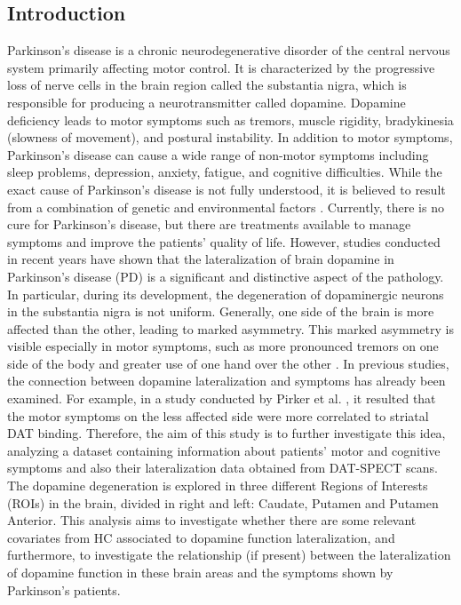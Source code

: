 \documentclass[]{article}
\begin{document}
\begin{multicols}{2}
\section{Introduction}
Parkinson's disease is a chronic neurodegenerative disorder of the central nervous system primarily affecting motor control. It is characterized by the progressive loss of nerve cells in the brain region called the substantia nigra, which is responsible for producing a neurotransmitter called dopamine. Dopamine deficiency leads to motor symptoms such as tremors, muscle rigidity, bradykinesia (slowness of movement), and postural instability. In addition to motor symptoms, Parkinson's disease can cause a wide range of non-motor symptoms including sleep problems, depression, anxiety, fatigue, and cognitive difficulties. While the exact cause of Parkinson's disease is not fully understood, it is believed to result from a combination of genetic and environmental factors \cite{beitz_parkinsons_2014}. Currently, there is no cure for Parkinson's disease, but there are treatments available to manage symptoms and improve the patients’ quality of life.  However, studies conducted in recent years \cite{shigekiyo_laterality_2020} have shown that the lateralization of brain dopamine in Parkinson's disease (PD) is a significant and distinctive aspect of the pathology. In particular, during its development, the degeneration of dopaminergic neurons in the substantia nigra is not uniform. Generally, one side of the brain is more affected than the other, leading to marked asymmetry. This marked asymmetry is visible especially in motor symptoms, such as more pronounced tremors on one side of the body and greater use of one hand over the other \cite{riederer_lateralisation_2018}. 
\newline
In previous studies, the connection between dopamine lateralization and symptoms has already been examined. For example, in a study conducted by Pirker et al. \cite{pirker_correlation_2003}, it resulted that the motor symptoms on the less affected side were more correlated to striatal DAT binding.
\newline
Therefore, the aim of this study is to further investigate this idea, analyzing a dataset containing information about patients' motor and cognitive symptoms and also their lateralization data obtained from DAT-SPECT scans. The dopamine degeneration is explored in three different Regions of Interests (ROIs) in the brain, divided in right and left: Caudate, Putamen and Putamen Anterior. This analysis aims to investigate whether there are some relevant covariates from HC associated to dopamine function lateralization, and furthermore, to investigate the relationship (if present) between the lateralization of dopamine function in these brain areas and the symptoms shown by Parkinson's patients. \cite{kagi_role_2010}

\end{multicols}
\end{document}

